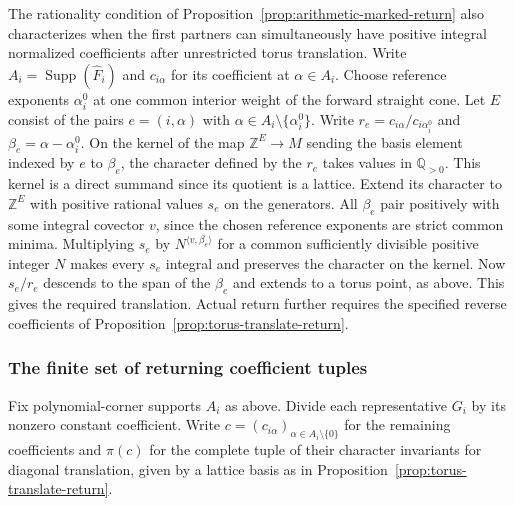 \documentclass[11pt,reqno]{amsart}
\numberwithin{equation}{section}
\theoremstyle{definition}
\theoremstyle{remark}
\DeclareMathOperator{\Supp}{Supp}
\begin{document}
The rationality condition of Proposition~\ref{prop:arithmetic-marked-return}
also characterizes when the first partners can simultaneously have
positive integral normalized coefficients after unrestricted torus
translation. Write \(A_i=\Supp(\widehat F_i)\) and \(c_{i\alpha}\)
for its coefficient at \(\alpha\in A_i\). Choose reference exponents
\(\alpha_i^0\) at one common interior weight of the forward straight
cone. Let \(E\) consist of the pairs \(e=(i,\alpha)\) with
\(\alpha\in A_i\setminus\{\alpha_i^0\}\). Write
\(r_e=c_{i\alpha}/c_{i\alpha_i^0}\) and \(\beta_e=\alpha-\alpha_i^0\).
On the kernel of the map \(\mathbb Z^E\to M\) sending the basis
element indexed by \(e\) to \(\beta_e\), the
character defined by the \(r_e\) takes values in \(\mathbb Q_{>0}\).
This kernel is a direct summand since its quotient is a lattice.
Extend its character to \(\mathbb Z^E\) with positive rational
values \(s_e\) on the generators. All \(\beta_e\) pair positively
with some integral covector \(v\), since the chosen reference exponents
are strict common minima. Multiplying \(s_e\) by
\(N^{\langle v,\beta_e\rangle}\) for a common sufficiently divisible
positive integer \(N\) makes every \(s_e\) integral and preserves the
character on the kernel. Now \(s_e/r_e\) descends to the span of
the \(\beta_e\) and extends to a torus point, as above. This gives
the required translation. Actual return further requires the
specified reverse coefficients of Proposition~\ref{prop:torus-translate-return}.

\subsubsection{The finite set of returning coefficient tuples}

Fix polynomial-corner supports \(A_i\) as above. Divide each
representative \(G_i\) by its nonzero constant coefficient. Write
\(c=(c_{i\alpha})_{\alpha\in A_i\setminus\{0\}}\) for the remaining
coefficients and \(\pi(c)\) for the complete tuple of their character
invariants for diagonal translation, given by a lattice basis as in
Proposition~\ref{prop:torus-translate-return}.
\end{document}
